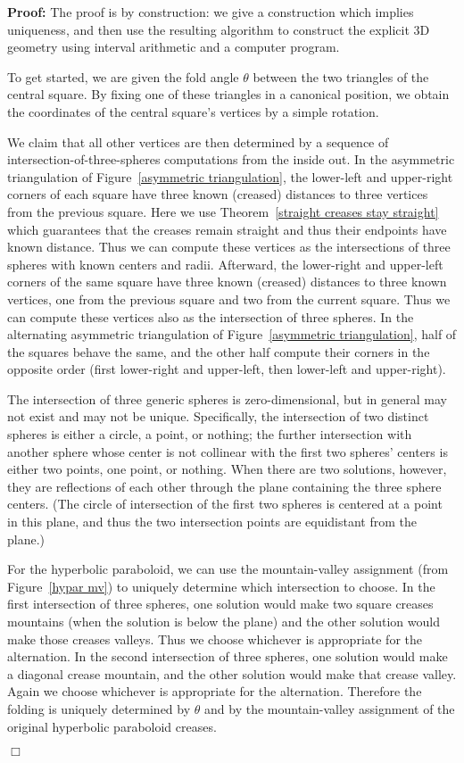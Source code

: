 \documentclass[11pt,letterpaper]{article}
\newenvironment{proof}{\noindent\textbf{Proof: }\ignorespaces}
  {\hspace*{\fill}$\Box$\medskip}
\begin{document}
\begin{proof}
  The proof is by construction: we give a construction which implies
  uniqueness, and then use the resulting algorithm to construct the explicit
  3D geometry using interval arithmetic and a computer program.

  To get started, we are given the fold angle $\theta$ between the two
  triangles of the central square.  By fixing one of these triangles in
  a canonical position, we obtain the coordinates of the central square's
  vertices by a simple rotation.

  We claim that all other vertices are then determined by a sequence of
  intersection-of-three-spheres computations from the inside out.
  In the asymmetric triangulation of Figure~\ref{asymmetric triangulation},
  the lower-left and upper-right corners of each square have three known
  (creased) distances to three vertices from the previous square.
  Here we use Theorem~\ref{straight creases stay straight} which guarantees that
  the creases remain straight and thus their endpoints have known distance.
  Thus we can compute these vertices as the intersections of three spheres
  with known centers and radii.  Afterward, the lower-right and upper-left
  corners of the same square have three known (creased) distances to three
  known vertices, one from the previous square and two from the current square.
  Thus we can compute these vertices also as the intersection of three spheres.
  In the alternating asymmetric triangulation of
  Figure~\ref{asymmetric triangulation}, half of the squares behave the same,
  and the other half compute their corners in the opposite order
  (first lower-right and upper-left, then lower-left and upper-right).

  The intersection of three generic spheres is zero-dimensional, but in general
  may not exist and may not be unique.  Specifically, the intersection of
  two distinct spheres is either a circle, a point, or nothing;
  the further intersection with another sphere whose center is not
  collinear with the first two spheres' centers is either two points,
  one point, or nothing.  When there are two solutions, however,
  they are reflections of each other through the plane containing the
  three sphere centers.  (The circle of intersection of the first two
  spheres is centered at a point in this plane, and thus the two
  intersection points are equidistant from the plane.)

  For the hyperbolic paraboloid, we can use the mountain-valley assignment
  (from Figure~\ref{hypar mv}) to uniquely determine which intersection to
  choose.  In the first intersection of three spheres, one solution would make
  two square creases mountains (when the solution is below the plane) and the
  other solution would make those creases valleys.  Thus we choose whichever
  is appropriate for the alternation.  In the second intersection of three
  spheres, one solution would make a diagonal crease mountain, and the other
  solution would make that crease valley.  Again we choose whichever is
  appropriate for the alternation.  Therefore the folding is uniquely
  determined by $\theta$ and by the mountain-valley assignment of the
  original hyperbolic paraboloid creases.


\end{proof}
\end{document}
